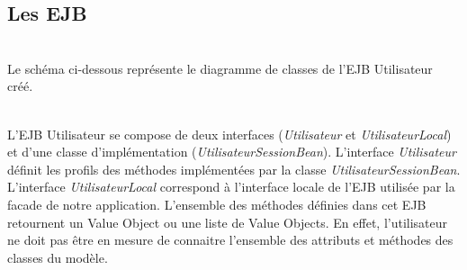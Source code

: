 \documentclass[10pt]{report}
\begin{document}
\subsection{Les EJB}
~\\
Le schéma ci-dessous représente le diagramme de classes de l'EJB Utilisateur créé. \\
	\begin{figure}[hp]
	      \begin{center}
	      \end{center}
	\end{figure}
\\

L'EJB Utilisateur se compose de deux interfaces (\textit{Utilisateur} et \textit{UtilisateurLocal}) et d'une classe d'implémentation (\textit{UtilisateurSessionBean}). L'interface \textit{Utilisateur} définit les profils des méthodes implémentées par la classe \textit{UtilisateurSessionBean}. L'interface \textit{UtilisateurLocal} correspond à l'interface locale de l'EJB utilisée par la facade de notre application. L'ensemble des méthodes définies dans cet EJB retournent un Value Object ou une liste de Value Objects. En effet, l'utilisateur ne doit pas être en mesure de connaitre l'ensemble des attributs et méthodes des classes du modèle.
\end{document}
